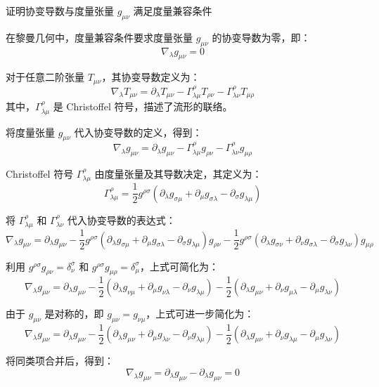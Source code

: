 \documentclass[12pt, a4paper, oneside, UTF8]{ctexbook}  %
\begin{document}
\begin{add}
证明协变导数与度量张量 $ g_{\mu\nu} $ 满足度量兼容条件

在黎曼几何中，度量兼容条件要求度量张量 $ g_{\mu\nu} $ 的协变导数为零，即：\[
\nabla_\lambda g_{\mu\nu} = 0\]

对于任意二阶张量 $ T_{\mu\nu} $，其协变导数定义为：\[
\nabla_\lambda T_{\mu\nu} = \partial_\lambda T_{\mu\nu} - \Gamma^\rho_{\lambda\mu} T_{\rho\nu} - \Gamma^\rho_{\lambda\nu} T_{\mu\rho}\]
其中，$ \Gamma^\rho_{\lambda\mu} $ 是 Christoffel 符号，描述了流形的联络。

将度量张量 $ g_{\mu\nu} $ 代入协变导数的定义，得到：\[
\nabla_\lambda g_{\mu\nu} = \partial_\lambda g_{\mu\nu} - \Gamma^\rho_{\lambda\mu} g_{\rho\nu} - \Gamma^\rho_{\lambda\nu} g_{\mu\rho}\]

Christoffel 符号 $ \Gamma^\rho_{\lambda\mu} $ 由度量张量及其导数决定，其定义为：\[
\Gamma^\rho_{\lambda\mu} = \frac{1}{2} g^{\rho\sigma} \left( \partial_\lambda g_{\sigma\mu} + \partial_\mu g_{\sigma\lambda} - \partial_\sigma g_{\lambda\mu} \right)\]

将 $ \Gamma^\rho_{\lambda\mu} $ 和 $ \Gamma^\rho_{\lambda\nu} $ 代入协变导数的表达式：\[
\nabla_\lambda g_{\mu\nu} = \partial_\lambda g_{\mu\nu} - \frac{1}{2} g^{\rho\sigma} \left( \partial_\lambda g_{\sigma\mu} + \partial_\mu g_{\sigma\lambda} - \partial_\sigma g_{\lambda\mu} \right) g_{\rho\nu}
- \frac{1}{2} g^{\rho\sigma} \left( \partial_\lambda g_{\sigma\nu} + \partial_\nu g_{\sigma\lambda} - \partial_\sigma g_{\lambda\nu} \right) g_{\mu\rho}\]

利用 $ g^{\rho\sigma} g_{\rho\nu} = \delta^\sigma_\nu $ 和 $ g^{\rho\sigma} g_{\mu\rho} = \delta^\sigma_\mu $，上式可简化为：\[
\nabla_\lambda g_{\mu\nu} = \partial_\lambda g_{\mu\nu} - \frac{1}{2} \left( \partial_\lambda g_{\nu\mu} + \partial_\mu g_{\nu\lambda} - \partial_\nu g_{\lambda\mu} \right)
- \frac{1}{2} \left( \partial_\lambda g_{\mu\nu} + \partial_\nu g_{\mu\lambda} - \partial_\mu g_{\lambda\nu} \right)\]

由于 $ g_{\mu\nu} $ 是对称的，即 $ g_{\mu\nu} = g_{\nu\mu} $，上式可进一步简化为：\[
\nabla_\lambda g_{\mu\nu} = \partial_\lambda g_{\mu\nu} - \frac{1}{2} \left( \partial_\lambda g_{\mu\nu} + \partial_\mu g_{\lambda\nu} - \partial_\nu g_{\lambda\mu} \right)
- \frac{1}{2} \left( \partial_\lambda g_{\mu\nu} + \partial_\nu g_{\lambda\mu} - \partial_\mu g_{\lambda\nu} \right)\]

将同类项合并后，得到：\[
\nabla_\lambda g_{\mu\nu} = \partial_\lambda g_{\mu\nu} - \partial_\lambda g_{\mu\nu} = 0\]
\end{add}











\ifx\allfiles\undefined
\end{document}
